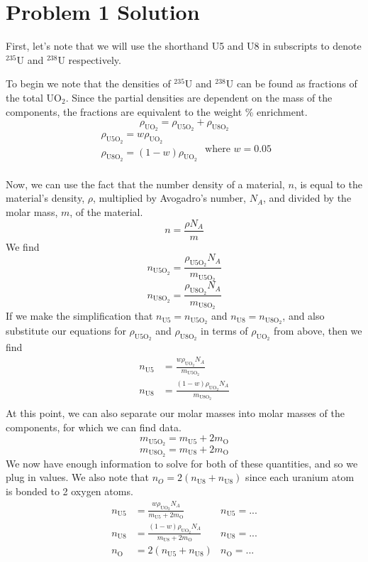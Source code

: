 \section*{Problem 1 Solution}

First, let's note that we will use the shorthand U5 and U8 in subscripts to denote $^{235}$U and $^{238}$U respectively. 

To begin we note that the densities of $^{235}$U and $^{238}$U can be found as fractions of the total UO$_2$. Since the partial densities are dependent on the mass of the components, the fractions are equivalent to the weight \% enrichment.
$$ \rho_{\text{UO}_2} = \rho_{\text{U5O}_2} + \rho_{\text{U8O}_2}$$
$$ \begin{array}{lr}
        \rho_{\text{U5O}_2} = w\rho_{\text{UO}_2}    \\
        \rho_{\text{U8O}_2} = (1-w)\rho_{\text{UO}_2}\\
        \end{array} \text{ where } w = 0.05 $$
        
Now, we can use the fact that the number density of a material, $n$, is equal to the material's density, $\rho$, multiplied by Avogadro's number, $N_A$, and divided by the molar mass, $m$, of the material. 
$$ n = \frac{\rho N_A}{m} $$
We find
$$ n_{\text{U5O}_2} = \frac{\rho_{\text{U5O}_2} N_A}{m_{\text{U5O}_2}} $$
$$ n_{\text{U8O}_2} = \frac{\rho_{\text{U8O}_2} N_A}{m_{\text{U8O}_2}} $$
If we make the simplification that $n_{\text{U5}} = n_{\text{U5O}_2}$ and $n_{\text{U8}} = n_{\text{U8O}_2}$, and also substitute our equations for $\rho_{\text{U5O}_2}$ and $\rho_{\text{U8O}_2}$ in terms of $\rho_{\text{UO}_2}$ from above, then we find 
\begin{align*}
n_{\text{U5}} &= \frac{w\rho_{\text{UO}_2} N_A}{m_{\text{U5O}_2}} \\
n_{\text{U8}} &= \frac{(1-w)\rho_{\text{UO}_2} N_A}{m_{\text{U8O}_2}} \\
\end{align*}
At this point, we can also separate our molar masses into molar masses of the components, for which we can find data. 
$$ m_{\text{U5O}_2} = m_{\text{U5}} + 2m_{\text{O}} $$
$$ m_{\text{U8O}_2} = m_{\text{U8}} + 2m_{\text{O}} $$
We now have enough information to solve for both of these quantities, and so we plug in values. We also note that $n_O = 2(n_{\text{U8}} + n_{\text{U8}})$ since each uranium atom is bonded to 2 oxygen atoms.
\begin{align*}
n_{\text{U5}}	&= \frac{w\rho_{\text{UO}_2} N_A}{m_{\text{U5}} + 2m_{\text{O}}}		& \boxed{n_{\text{U5}}= ... }\\
n_{\text{U8}}	&= \frac{(1-w)\rho_{\text{UO}_2} N_A}{m_{\text{U8}} + 2m_{\text{O}}} 	& \boxed{n_{\text{U8}}= ... }\\
n_{\text{O}}	&= 2(n_{\text{U5}} + n_{\text{U8}})  									& \boxed{n_{\text{O}}= ...  }\\
\end{align*}


